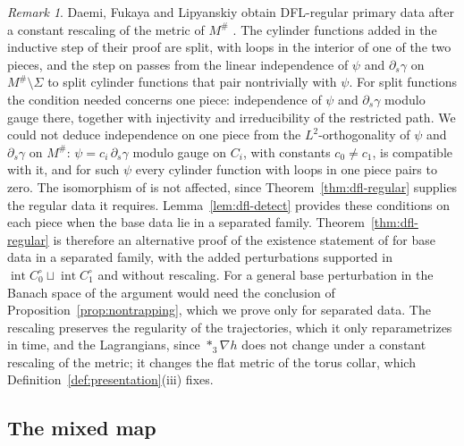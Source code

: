 \documentclass[11pt]{amsart}
\theoremstyle{definition}
\theoremstyle{remark}
\newtheorem{remark}[theorem]{Remark}
\theoremstyle{plain}
\numberwithin{equation}{section}
\begin{document}
\begin{remark}\label{rem:dfl-regular}
Daemi, Fukaya and Lipyanskiy obtain DFL-regular primary data after a constant rescaling of the
metric of $M^\#$ \cite[Lemma~2.56 and Proposition~6.8]{DFL}. The cylinder functions added in the
inductive step of their proof are split, with loops in the interior of one of the two pieces,
and the step on \cite[p.~80]{DFL} passes from the linear independence of $\psi$ and
$\partial_s\gamma$ on $M^\#\setminus\Sigma$ to split cylinder functions that pair nontrivially
with $\psi$. For split functions the condition needed concerns one piece: independence of
$\psi$ and $\partial_s\gamma$ modulo gauge there, together with injectivity and irreducibility
of the restricted path. We could not deduce independence on one piece from the
$L^2$-orthogonality of $\psi$ and $\partial_s\gamma$ on $M^\#$: $\psi=c_i\,\partial_s\gamma$
modulo gauge on $C_i$, with constants $c_0\ne c_1$, is compatible with it, and for such $\psi$
every cylinder function with loops in one piece pairs to zero. The isomorphism of
\cite[Theorem~3.29]{DFL} is not affected, since Theorem~\ref{thm:dfl-regular} supplies the
regular data it requires.
Lemma~\ref{lem:dfl-detect} provides these conditions on each piece when the base data lie in a
separated family. Theorem~\ref{thm:dfl-regular} is therefore an alternative proof of the existence
statement of \cite[Proposition~6.8]{DFL} for base data in a separated family, with the added
perturbations supported in $\operatorname{int}C_0^\circ\sqcup\operatorname{int}C_1^\circ$ and without
rescaling. For a general base perturbation in the Banach space of \cite[Section~6.1]{DFL} the
argument would need the conclusion of Proposition~\ref{prop:nontrapping}, which we prove only for
separated data. The rescaling preserves the regularity of the trajectories, which it only
reparametrizes in time, and the Lagrangians, since $*_3\nabla h$ does not change under a constant
rescaling of the metric; it changes the flat metric of the torus collar, which
Definition~\ref{def:presentation}(iii) fixes.
\end{remark}

\subsection{The mixed map}\label{subsec:mixed-iso}
\end{document}
